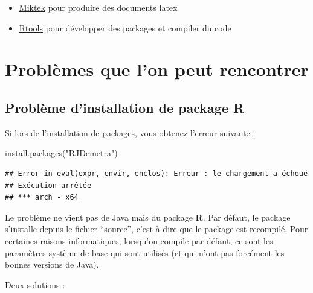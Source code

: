 \documentclass[
]{article}
\newenvironment{Shaded}{\begin{snugshade}}{\end{snugshade}}
\newcommand{\FunctionTok}[1]{\textcolor[rgb]{0.28,0.35,0.67}{#1}}
\newcommand{\NormalTok}[1]{\textcolor[rgb]{0.00,0.46,0.62}{#1}}
\newcommand{\StringTok}[1]{\textcolor[rgb]{0.13,0.47,0.30}{#1}}
\providecommand{\tightlist}{%
  \setlength{\itemsep}{0pt}\setlength{\parskip}{0pt}}
\begin{document}
\begin{itemize}
\tightlist
\item
  \href{https://miktex.org/howto/install-miktex}{Miktek} pour produire
  des documents latex
\item
  \href{https://cran.r-project.org/bin/windows/Rtools/rtools42/rtools.html}{Rtools}
  pour développer des packages et compiler du code
\end{itemize}

\hypertarget{probluxe8mes-que-lon-peut-rencontrer}{%
\section{Problèmes que l'on peut
rencontrer}\label{probluxe8mes-que-lon-peut-rencontrer}}

\hypertarget{probluxe8me-dinstallation-de-package-r}{%
\subsection{\texorpdfstring{Problème d'installation de package
\textbf{R}}{Problème d'installation de package R}}\label{probluxe8me-dinstallation-de-package-r}}

Si lors de l'installation de packages, vous obtenez l'erreur suivante :

\begin{Shaded}
\begin{Highlighting}[]
\FunctionTok{install.packages}\NormalTok{(}\StringTok{"RJDemetra"}\NormalTok{)}
\end{Highlighting}
\end{Shaded}

\begin{verbatim}
## Error in eval(expr, envir, enclos): Erreur : le chargement a échoué
## Exécution arrêtée
## *** arch - x64
\end{verbatim}

Le problème ne vient pas de Java mais du package \textbf{R}. Par défaut,
le package s'installe depuis le fichier ``source'', c'est-à-dire que le
package est recompilé. Pour certaines raisons informatiques, lorsqu'on
compile par défaut, ce sont les paramètres système de base qui sont
utilisés (et qui n'ont pas forcément les bonnes versions de Java).

Deux solutions :
\end{document}
